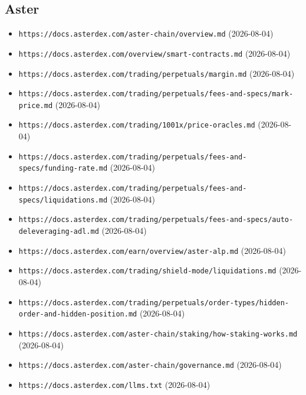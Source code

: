 \subsection*{Aster}
\begin{itemize}\setlength{\itemsep}{0pt}\small
\item \texttt{https://docs.asterdex.com/aster-chain/overview.md} (2026-08-04)
\item \texttt{https://docs.asterdex.com/overview/smart-contracts.md} (2026-08-04)
\item \texttt{https://docs.asterdex.com/trading/perpetuals/margin.md} (2026-08-04)
\item \texttt{https://docs.asterdex.com/trading/perpetuals/fees-and-specs/mark-price.md} (2026-08-04)
\item \texttt{https://docs.asterdex.com/trading/1001x/price-oracles.md} (2026-08-04)
\item \texttt{https://docs.asterdex.com/trading/perpetuals/fees-and-specs/funding-rate.md} (2026-08-04)
\item \texttt{https://docs.asterdex.com/trading/perpetuals/fees-and-specs/liquidations.md} (2026-08-04)
\item \texttt{https://docs.asterdex.com/trading/perpetuals/fees-and-specs/auto-deleveraging-adl.md} (2026-08-04)
\item \texttt{https://docs.asterdex.com/earn/overview/aster-alp.md} (2026-08-04)
\item \texttt{https://docs.asterdex.com/trading/shield-mode/liquidations.md} (2026-08-04)
\item \texttt{https://docs.asterdex.com/trading/perpetuals/order-types/hidden-order-and-hidden-position.md} (2026-08-04)
\item \texttt{https://docs.asterdex.com/aster-chain/staking/how-staking-works.md} (2026-08-04)
\item \texttt{https://docs.asterdex.com/aster-chain/governance.md} (2026-08-04)
\item \texttt{https://docs.asterdex.com/llms.txt} (2026-08-04)
\end{itemize}

